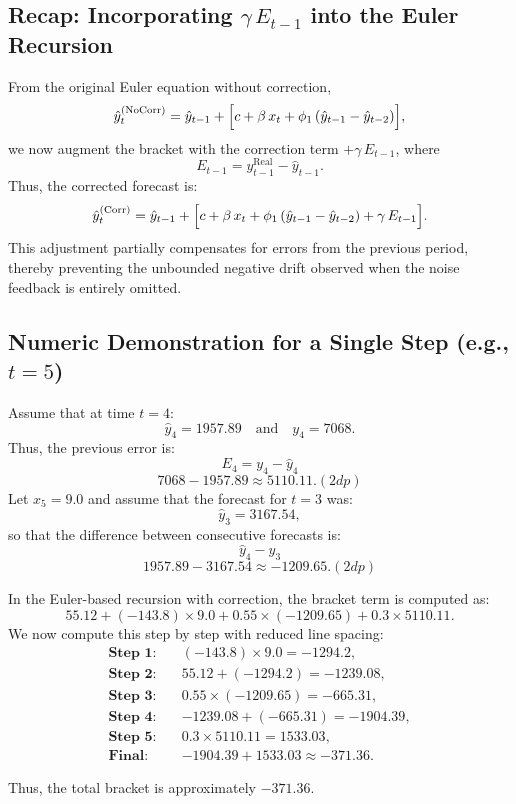 \documentclass[10pt]{article}
\begin{document}
\subsection{Recap: Incorporating \(\gamma\,E_{t-1}\) into the Euler Recursion}
From the original Euler equation without correction,
\[
\hat{y}_t^{(\mathrm{NoCorr})} = \hat{y}_{t-1} + \Bigl[c + \beta\,x_t + \phi_1\,(\hat{y}_{t-1}-\hat{y}_{t-2})\Bigr],
\]
we now augment the bracket with the correction term \(+\gamma\,E_{t-1}\), where
\[
E_{t-1} = y_{t-1}^{\mathrm{Real}} - \hat{y}_{t-1}.
\]
Thus, the corrected forecast is:
\[
\hat{y}_t^{(\mathrm{Corr})} = \hat{y}_{t-1} + \Bigl[c + \beta\,x_t + \phi_1\,(\hat{y}_{t-1}-\hat{y}_{t-2}) + \gamma\,E_{t-1}\Bigr].
\]
This adjustment partially compensates for errors from the previous period, thereby preventing the unbounded negative drift observed when the noise feedback is entirely omitted.

\subsection{Numeric Demonstration for a Single Step (e.g., \(t=5\))}
Assume that at time \(t=4\):
\[
\hat{y}_4 = 1957.89 \quad \text{and} \quad y_4 = 7068.
\]
Thus, the previous error is:
\[
E_4 = y_4 - \hat{y}_4 \] \[ 7068 - 1957.89 \approx 5110.11. (2dp)
\]
Let \(x_5 = 9.0\) and assume that the forecast for \(t=3\) was:
\[
\hat{y}_3 = 3167.54,
\]
so that the difference between consecutive forecasts is:
\[
\hat{y}_4 - \hat{y}_3 \] \[ 1957.89 - 3167.54 \approx -1209.65. (2dp)
\]

In the Euler-based recursion with correction, the bracket term is computed as:
\[
55.12 + (-143.8)\times 9.0 + 0.55\times (-1209.65) + 0.3\times 5110.11.
\]
We now compute this step by step with reduced line spacing:
\begingroup
\setlength{\jot}{1mm}
\begin{align*}
\textbf{Step 1:} \quad & (-143.8) \times 9.0 = -1294.2,\\
\textbf{Step 2:} \quad & 55.12 + (-1294.2) = -1239.08,\\
\textbf{Step 3:} \quad & 0.55 \times (-1209.65) = -665.31,\\
\textbf{Step 4:} \quad & -1239.08 + (-665.31) = -1904.39,\\
\textbf{Step 5:} \quad & 0.3 \times 5110.11 = 1533.03,\\
\textbf{Final:} \quad & -1904.39 + 1533.03 \approx -371.36.
\end{align*}
\endgroup

Thus, the total bracket is approximately \(-371.36\).
\end{document}
